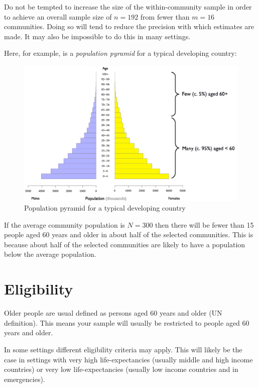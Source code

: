 \documentclass[12pt,a4paper]{book}
\theoremstyle{definition}
\theoremstyle{definition}
\theoremstyle{definition}
\theoremstyle{remark}
\begin{document}
Do not be tempted to increase the size of the within-community sample in
order to achieve an overall sample size of \(n = 192\) from fewer than
\(m = 16\) communities. Doing so will tend to reduce the precision with
which estimates are made. It may also be impossible to do this in many
settings.

Here, for example, is a \emph{population pyramid} for a typical
developing country:

\begin{figure}[H]

{\centering \includegraphics{figures/popPyramid1} 

}

\caption{Population pyramid for a typical developing country}\label{fig:sample2}
\end{figure}

If the average community population is \(N = 300\) then there will be
fewer than 15 people aged 60 years and older in about half of the
selected communities. This is because about half of the selected
communities are likely to have a population below the average
population.

\hypertarget{eligibility}{%
\section{Eligibility}\label{eligibility}}

Older people are usual defined as persons aged 60 years and older (UN
definition). This means your sample will usually be restricted to people
aged 60 years and older.

In some settings different eligibility criteria may apply. This will
likely be the case in settings with very high life-expectancies (usually
middle and high income countries) or very low life-expectancies (usually
low income countries and in emergencies).
\end{document}
